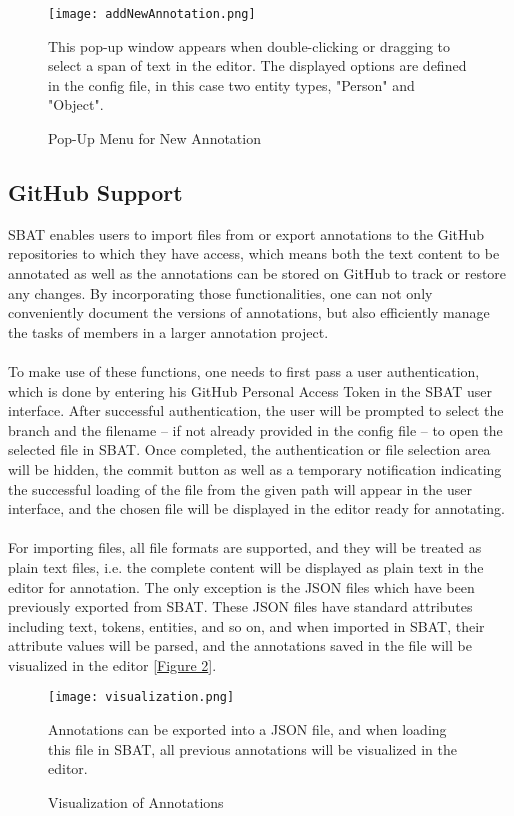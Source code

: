 \documentclass[12ptm a4paper]{article}
\begin{document}
\begin{figure}[H]
{\centering
\texttt{[image: addNewAnnotation.png]}
\label{figure1}
\caption{Pop-Up Menu for New Annotation}
}
{ This pop-up window appears when double-clicking or dragging to select a span of text in the editor. The displayed options are defined in the config file, in this case two entity types, "Person" and "Object".\par} 
\end{figure}
\subsection{GitHub Support}
SBAT enables users to import files from or export annotations to the GitHub repositories to which they have access, which means both the text content to be annotated as well as the annotations can be stored on GitHub to track or restore any changes. By incorporating those functionalities, one can not only conveniently document the versions of annotations, but also efficiently manage the tasks of members in a larger annotation project.\\
\\
To make use of these functions, one needs to first pass a user authentication, which is done by entering his GitHub Personal Access Token in the SBAT user interface. After successful authentication, the user will be prompted to select the branch and the filename -- if not already provided in the config file -- to open the selected file in SBAT. Once completed, the authentication or file selection area will be hidden, the commit button as well as a temporary notification indicating the successful loading of the file from the given path will appear in the user interface, and the chosen file will be displayed in the editor ready for annotating.\\
\\
For importing files, all file formats are supported, and they will be treated as plain text files, i.e. the complete content will be displayed as plain text in the editor for annotation. The only exception is the JSON files which have been previously exported from SBAT. These JSON files have standard attributes including text, tokens, entities, and so on, and when imported in SBAT, their attribute values will be parsed, and the annotations saved in the file will be visualized in the editor [\hyperref[figure2]{Figure 2}].\\

\begin{figure}[H]
{\centering
\texttt{[image: visualization.png]}
\label{figure2}
\caption{Visualization of Annotations}
}
{ Annotations can be exported into a JSON file, and when loading this file in SBAT, all previous annotations will be visualized in the editor.\par}
\end{figure}
\end{document}
